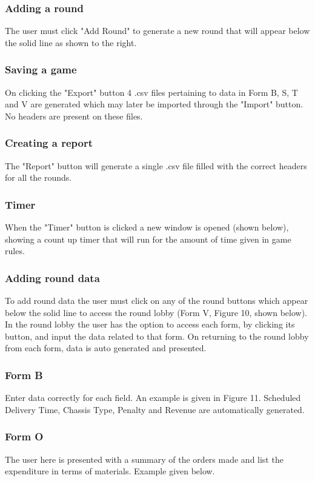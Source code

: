 \documentclass{l3proj}
\begin{document}
\subsubsection{Adding a round}
The user must click "Add Round" to generate a new round that will appear below the solid line as shown to the right.
\subsubsection{Saving a game}
On clicking the "Export" button 4 .csv files pertaining to data in Form B, S, T and V are generated which may later be imported through the "Import" button. No headers are present on these files.
\subsubsection{Creating a report}
The "Report" button will generate a single .csv file filled with the correct headers for all the rounds.
\subsubsection{Timer}
When the "Timer" button is clicked a new window is opened (shown below), showing a count up timer that will run for the amount of time given in game rules.

\subsubsection{Adding round data}
To add round data the user must click on any of the round buttons which appear below the solid line to access the round lobby (Form V, Figure 10, shown below).
In the round lobby the user has the option to access each form, by clicking its button, and input the data related to that form. On returning to the round lobby from each form, data is auto generated and presented.

\subsubsection{Form B}

Enter data correctly for each field. An example is given in Figure 11. Scheduled Delivery Time, Chassis Type, Penalty and Revenue are automatically generated. 

\subsubsection{Form O}
The user here is presented with a summary of the orders made and list the expenditure in terms of materials. Example given below.

\end{document}
